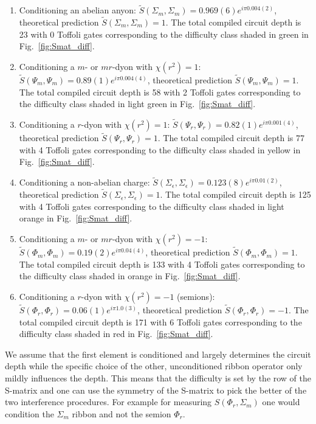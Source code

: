\documentclass[a4paper,twocolumn,11pt]{quantumarticle}
\begin{document}
\begin{enumerate}
	\item Conditioning an abelian anyon: $\tilde{S}(\Sigma_m, \Sigma_m) = 0.969(6)e^{i\pi 0.004(2)}$, theoretical prediction $\tilde{S}(\Sigma_m, \Sigma_m)=1$. The total compiled circuit depth is 23 with 0 Toffoli gates corresponding to the difficulty class shaded in green in Fig.~\ref{fig:Smat_diff}.
	\item Conditioning a $m$- or $mr$-dyon with $\chi(r^2) = 1$: $\tilde{S}(\Psi_m, \Psi_m) = 0.89(1)e^{i\pi 0.004(4)}$, theoretical prediction $\tilde{S}(\Psi_m, \Psi_m)=1$. The total compiled circuit depth is 58 with 2 Toffoli gates corresponding to the difficulty class shaded in light green in Fig.~\ref{fig:Smat_diff}.
	\item Conditioning a $r$-dyon with $\chi(r^2) = 1$: $\tilde{S}(\Psi_r, \Psi_r) = 0.82(1)e^{i\pi 0.001(4)}$, theoretical prediction $\tilde{S}(\Psi_r, \Psi_r)=1$. The total compiled circuit depth is 77 with 4 Toffoli gates corresponding to the difficulty class shaded in yellow in Fig.~\ref{fig:Smat_diff}.
	\item Conditioning a non-abelian charge: $\tilde{S}(\Sigma_\epsilon, \Sigma_\epsilon) = 0.123(8)e^{i\pi 0.01(2)}$, theoretical prediction $\tilde{S}(\Sigma_\epsilon, \Sigma_\epsilon)=1$. The total compiled circuit depth is 125 with 4 Toffoli gates corresponding to the difficulty class shaded in light orange in Fig.~\ref{fig:Smat_diff}.
	\item Conditioning a $m$- or $mr$-dyon with $\chi(r^2) = -1$: $\tilde{S}(\Phi_m, \Phi_m) = 0.19(2)e^{i\pi 0.04(4)}$, theoretical prediction $\tilde{S}(\Phi_m, \Phi_m)=1$. The total compiled circuit depth is 133 with 4 Toffoli gates corresponding to the difficulty class shaded in orange in Fig.~\ref{fig:Smat_diff}.
	\item Conditioning a $r$-dyon with $\chi(r^2) = -1$ (semions): $\tilde{S}(\Phi_r, \Phi_r) = 0.06(1)e^{i\pi 1.0(3)}$, theoretical prediction $\tilde{S}(\Phi_r, \Phi_r)=-1$. The total compiled circuit depth is 171 with 6 Toffoli gates corresponding to the difficulty class shaded in red in Fig.~\ref{fig:Smat_diff}.
\end{enumerate}
We assume that the first element is conditioned and largely determines the circuit depth while the specific choice of the other, unconditioned ribbon operator only mildly influences the depth. This means that the difficulty is set by the row of the S-matrix and one can use the symmetry of the S-matrix to pick the better of the two interference procedures. For example for measuring $S(\Phi_r, \Sigma_m)$ one would condition the $\Sigma_m$ ribbon and not the semion $\Phi_r$.
\end{document}
